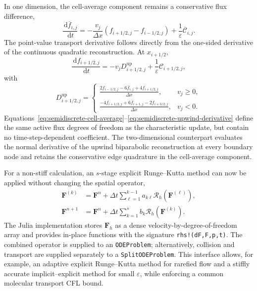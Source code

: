 \documentclass[preprint,3p,12pt]{elsarticle}
\newcommand{\dd}{\,\mathrm{d}}
\newcommand{\vct}[1]{\boldsymbol{#1}}
\newcommand{\avg}[1]{\overline{#1}}
\begin{document}
In one dimension, the cell-average component remains a conservative flux difference,
\begin{equation}
  \frac{\dd\avg{f}_{i,j}}{\dd t}
  =-\frac{v_j}{\Delta x}
  \left(f_{i+1/2,j}-f_{i-1/2,j}\right)
  +\frac{1}{\varepsilon}\avg{\mathcal{C}}_{i,j}.
  \label{eq:semidiscrete-cell-average}
\end{equation}
The point-value transport derivative follows directly from the one-sided derivative of the continuous quadratic reconstruction. At $x_{i+1/2}$,
\begin{equation}
  \frac{\dd f_{i+1/2,j}}{\dd t}
  =-v_jD_{i+1/2,j}^{\mathrm{up}}
  +\frac{1}{\varepsilon}\mathcal{C}_{i+1/2,j},
  \label{eq:semidiscrete-point-value}
\end{equation}
with
\begin{equation}
  D_{i+1/2,j}^{\mathrm{up}}
  =\begin{cases}
  \displaystyle
  \frac{2f_{i-1/2,j}-6\avg{f}_{i,j}+4f_{i+1/2,j}}{\Delta x},
  & v_j\ge0,\\[2ex]
  \displaystyle
  \frac{-4f_{i+1/2,j}+6\avg{f}_{i+1,j}-2f_{i+3/2,j}}{\Delta x},
  & v_j<0.
  \end{cases}
  \label{eq:semidiscrete-upwind-derivative}
\end{equation}
Equations~\eqref{eq:semidiscrete-cell-average}--\eqref{eq:semidiscrete-upwind-derivative} define the same active flux degrees of freedom as the characteristic update, but contain no time-step-dependent coefficient. The two-dimensional counterpart evaluates the normal derivative of the upwind biparabolic reconstruction at every boundary node and retains the conservative edge quadrature in the cell-average component.

For a non-stiff calculation, an $s$-stage explicit Runge--Kutta method can now be applied without changing the spatial operator,
\begin{align}
  \vct{F}^{(k)}
  & =\vct{F}^{n}
  +\Delta t\sum_{\ell=1}^{k-1}a_{k\ell}
  \mathcal{R}_h\left(\vct{F}^{(\ell)}\right),
  \label{eq:explicit-rk-stage}\\
  \vct{F}^{n+1}
  & =\vct{F}^{n}
  +\Delta t\sum_{k=1}^{s}b_k
  \mathcal{R}_h\left(\vct{F}^{(k)}\right).
  \label{eq:explicit-rk-update}
\end{align}
The Julia implementation stores $\vct{F}_h$ as a dense velocity-by-degree-of-freedom array and provides in-place functions with the signature \texttt{rhs!(dF,F,p,t)}. The combined operator is supplied to an \texttt{ODEProblem}; alternatively, collision and transport are supplied separately to a \texttt{SplitODEProblem}. This interface allows, for example, an adaptive explicit Runge--Kutta method for rarefied flow and a stiffly accurate implicit--explicit method for small $\varepsilon$, while enforcing a common molecular transport CFL bound.
\end{document}
